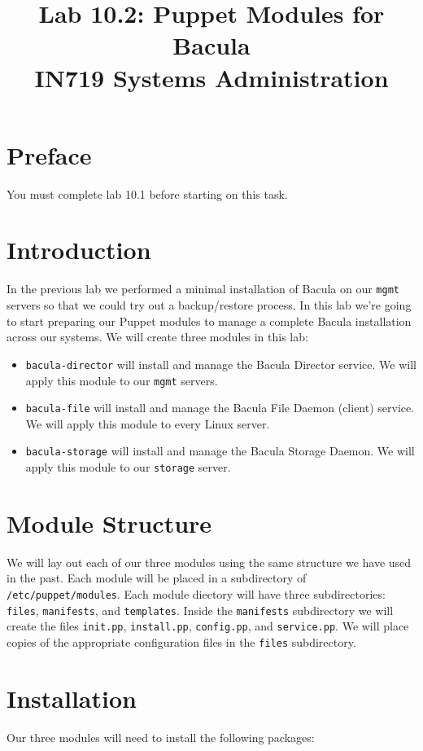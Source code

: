 \documentclass{article}   	%
\title{Lab 10.2:  Puppet Modules for Bacula\\ IN719 Systems Administration}
\date{}							%
\begin{document}
\maketitle

\section*{Preface}
You must complete lab 10.1 before starting on this task. 

\section*{Introduction}
In the previous lab we performed a minimal installation of Bacula on our \texttt{mgmt} servers so that we could try out a backup/restore process. In this lab we're going to start preparing our Puppet modules to manage a complete Bacula installation across our systems. We will create three modules in this lab:

\begin{itemize}
	\item \texttt{bacula-director} will install and manage the Bacula Director service.  We will apply this module to our \texttt{mgmt} servers.
	\item \texttt{bacula-file} will install and manage the Bacula File Daemon (client) service. We will apply this module to every Linux server.
	\item \texttt{bacula-storage} will install and manage the Bacula Storage Daemon.  We will apply this module to our \texttt{storage} server.
\end{itemize}

\section{Module Structure}
We will lay out each of our three modules using the same structure we have used in the past.  Each module will be placed in a subdirectory of \texttt{/etc/puppet/modules}.  Each module diectory will have three subdirectories: \texttt{files}, \texttt{manifests}, and \texttt{templates}.  Inside the \texttt{manifests} subdirectory we will create the files \texttt{init.pp}, \texttt{install.pp}, \texttt{config.pp}, and \texttt{service.pp}. We will place copies of the appropriate configuration files in the \texttt{files} subdirectory.

\section{Installation}
Our three modules will need to install the following packages:
\end{document}

